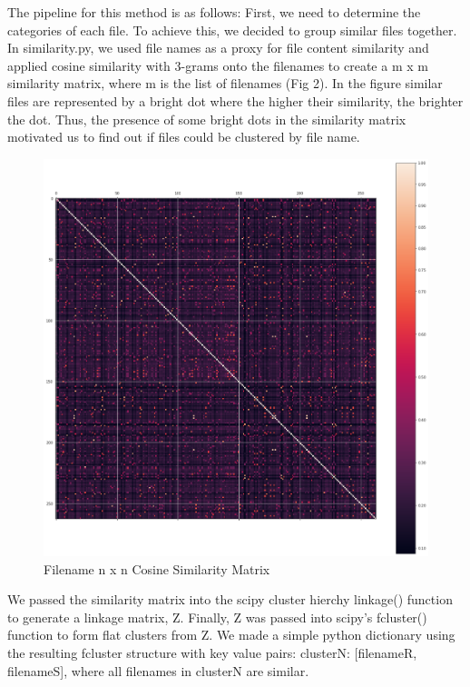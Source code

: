\documentclass[sigconf,authordraft]{acmart}
\begin{document}
The pipeline for this method is as follows: First, we need to determine the categories of each file. To achieve this, we decided to group similar files together. In similarity.py, we used file names as a proxy for file content similarity and applied cosine similarity with 3-grams onto the filenames to create a m x m similarity matrix, where m is the list of filenames (Fig 2). In the figure similar files are represented by a bright dot where the higher their similarity, the brighter the dot. Thus, the presence of some bright dots in the similarity matrix motivated us to find out if files could be clustered by file name.

\begin{figure}[h]
  \centering
  \includegraphics[width=\linewidth]{similarity.png}
  \caption{Filename n x n Cosine Similarity Matrix}
\end{figure}


We passed the similarity matrix into the scipy cluster hierchy linkage() function to generate a linkage matrix, Z. Finally, Z was passed into scipy’s fcluster() function to form flat clusters from Z. We made a simple python dictionary using the resulting fcluster structure with key value pairs: clusterN: [filenameR, filenameS], where all filenames in clusterN are similar. 
\end{document}
